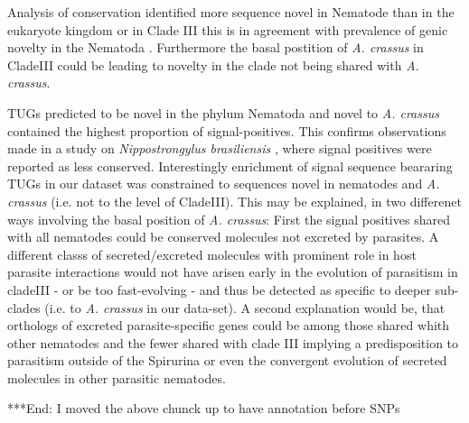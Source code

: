 \documentclass[10pt]{bmc_article}
\newenvironment{bmcformat}{\begin{raggedright}\baselineskip20pt\sloppy\setboolean{publ}{false}}{\end{raggedright}\baselineskip20pt\sloppy}
\begin{document}
\begin{bmcformat}
Analysis of conservation identified more sequence novel in Nematode
than in the eukaryote kingdom or in Clade III this is in agreement
with prevalence of genic novelty in the Nematoda
\cite{wasmuth_extent_2008}. Furthermore the basal postition of
\textit{A. crassus} in CladeIII could be leading to novelty in the
clade not being shared with \textit{A. crassus}.

TUGs predicted to be novel in the phylum Nematoda and novel to
\textit{A. crassus} contained the highest proportion of
signal-positives. This confirms observations made in a study on
\textit{Nippostrongylus brasiliensis} \cite{harcus_signal_2004}, where
signal positives were reported as less conserved. Interestingly
enrichment of signal sequence beararing TUGs in our dataset was
constrained to sequences novel in nematodes and \textit{A. crassus}
(i.e. not to the level of CladeIII). This may be explained, in two
differenet ways involving the basal position of \textit{A. crassus}:
First the signal positives shared with all nematodes could be
conserved molecules not excreted by parasites. A different classs of
secreted/excreted molecules with prominent role in host parasite
interactions would not have arisen early in the evolution of
parasitism in cladeIII - or be too fast-evolving - and thus be
detected as specific to deeper sub-clades (i.e. to \textit{A. crassus}
in our data-set). A second explanation would be, that orthologs of
excreted parasite-specific genes could be among those shared whith
other nematodes and the fewer shared with clade III implying a
predisposition to parasitism outside of the Spirurina or even the
convergent evolution of secreted molecules in other parasitic
nematodes.

***End: I moved the above chunck up to have annotation before SNPs


\end{bmcformat}
\end{document}

